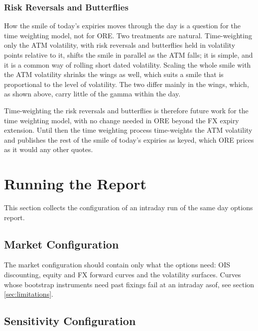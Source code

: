 \documentclass[12pt, a4paper]{article}
\begin{document}
\subsubsection*{Risk Reversals and Butterflies}

How the smile of today's expiries moves through the day is a question for the time weighting model, not for ORE. Two treatments
are natural. Time-weighting only the ATM volatility, with risk reversals and butterflies held in volatility points relative to
it, shifts the smile in parallel as the ATM falls; it is simple, and it is a common way of rolling short dated
volatility. Scaling the whole smile with the ATM volatility shrinks the wings as well, which suits a smile that is
proportional to the level of volatility. The two differ mainly in the wings, which, as shown above, carry little of
the gamma within the day.

Time-weighting the risk reversals and butterflies is therefore future work for the time weighting model, with no change needed in ORE
beyond the FX expiry extension. Until then the time weighting process time-weights the ATM volatility and publishes the rest of the
smile of today's expiries as keyed, which ORE prices as it would any other quotes.

\section{Running the Report}\label{sec:setup}

This section collects the configuration of an intraday run of the same day options report.

\subsection{Market Configuration}

The market configuration should contain only what the options need: OIS discounting, equity and FX forward curves and
the volatility surfaces. Curves whose bootstrap instruments need past fixings fail at an intraday asof, see section
\ref{sec:limitations}.

\subsection{Sensitivity Configuration}
\end{document}
